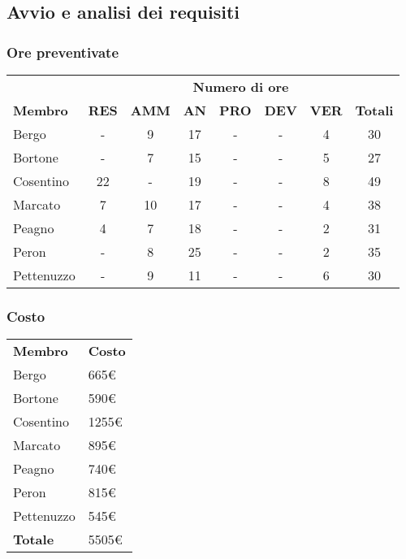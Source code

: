 \subsection{Avvio e analisi dei requisiti}
	\subsubsection{Ore preventivate}
		\begin{tabular}{| l | c c c c c c | c |}
			\rowcolor{LightBlue}
			& \multicolumn{7}{c}{\textbf{\color{white}Numero di ore}}	\\
	
			\rowcolor{LightBlue}
			\textbf{\color{white}Membro}
			& \textbf{\color{white}RES}
			& \textbf{\color{white}AMM}
			& \textbf{\color{white}AN}
			& \textbf{\color{white}PRO}
			& \textbf{\color{white}DEV}
			& \textbf{\color{white}VER}
			& \textbf{\color{white}Totali}\\
	
			Bergo & - & 9 & 17 & - & - & 4 & 30\\
			Bortone & - & 7 & 15	& - & - & 5 & 27\\
			Cosentino & 22 & - & 19 & - & - & 8 & 49\\
			Marcato & 7 & 10 & 17 & - & - & 4 & 38\\
			Peagno & 4 & 7 & 18 & - & - & 2 & 31\\
			Peron & - & 8 & 25 & - & - & 2 & 35\\
			Pettenuzzo & - & 9 & 11 & - & - & 6 & 30\\ \hline
		\end{tabular}
	\subsubsection{Costo}
		\begin{tabular}{| l | l |}
			\rowcolor{LightBlue}
			\textbf{\color{white}Membro}
			& \textbf{\color{white}Costo}\\
			
			Bergo & 665€\\
			Bortone & 590€\\
			Cosentino & 1255€\\
			Marcato & 895€\\
			Peagno & 740€\\
			Peron & 815€\\
			Pettenuzzo & 545€\\ \hline
			\textbf{Totale} & 5505€\\ \hline
		\end{tabular}